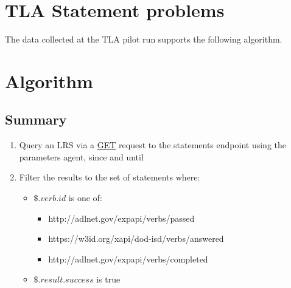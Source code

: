 \documentclass{article}
\begin{document}
\section{TLA Statement problems}
The data collected at the TLA pilot run supports the following
algorithm.

\section{Algorithm}

\subsection{Summary}
\begin{enumerate}
  \item Query an LRS via a \href{https://github.com/adlnet/xAPI-Spec/blob/master/xAPI-Communication.md#213-get-statements}{GET} request to the statements endpoint using the parameters agent, since and until
  \item Filter the results to the set of statements where:
    \begin{itemize}
    \item $\$.verb.id$ is one of:
      \begin{itemize}
      \item http://adlnet.gov/expapi/verbs/passed
      \item https://w3id.org/xapi/dod-isd/verbs/answered
      \item http://adlnet.gov/expapi/verbs/completed
      \end{itemize}
    \item $\$.result.success$ is true
    \end{itemize}
  \end{enumerate}
\end{document}
